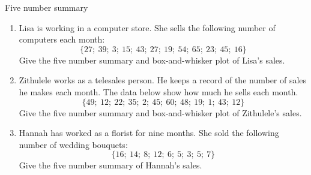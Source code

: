 \begin{exercises}{Five number summary}
\begin{enumerate}

\item Lisa is working in a computer store. She sells the following
  number of computers each month:
  \begin{equation}
    \{27;\ 39;\ 3;\ 15;\ 43;\ 27;\ 19;\ 54;\ 65;\ 23;\ 45;\ 16\}
  \end{equation}
  Give the five number summary and box-and-whisker plot of Lisa's
  sales.

\item Zithulele works as a telesales person. He keeps a record of the
  number of sales he makes each month. The data below show how much he
  sells each month.
  \begin{equation}
    \{49;\ 12;\ 22;\ 35;\ 2;\ 45;\ 60;\ 48;\ 19;\ 1;\ 43;\ 12\}
  \end{equation}
  Give the five number summary and box-and-whisker plot of Zithulele's
  sales.

\item Hannah has worked as a florist for nine months. She sold the
  following number of wedding bouquets:
  \begin{equation}
    \{16;\ 14;\ 8;\ 12;\ 6;\ 5;\ 3;\ 5;\ 7\}
  \end{equation}
  Give the five number summary of Hannah's sales.

\end{enumerate}
\end{exercises}

